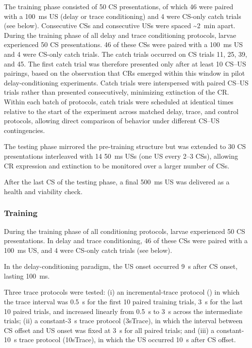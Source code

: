 The training phase consisted of 50 CS presentations, of which 46 were paired with a \SI{100}{\milli\second} US (delay or trace conditioning) and 4 were CS-only catch trials (see below). Consecutive CSs and consecutive USs were spaced \textasciitilde\SI{2}{\minute} apart.
During the training phase of all delay and trace conditioning protocols, larvae experienced 50 CS presentations. 46 of these CSs were paired with a \SI{100}{\milli\second} US and 4 were CS-only catch trials. The catch trials occurred on CS trials 11, 25, 39, and 45. The first catch trial was therefore presented only after at least 10 CS--US pairings, based on the observation that CRs emerged within this window in pilot delay-conditioning experiments. Catch trials were interspersed with paired CS--US trials rather than presented consecutively, minimizing extinction of the CR. Within each batch of protocols, catch trials were scheduled at identical times relative to the start of the experiment across matched delay, trace, and control protocols, allowing direct comparison of behavior under different CS--US contingencies.

The testing phase mirrored the pre-training structure but was extended to 30 CS presentations interleaved with 14 \SI{50}{\milli\second} USs (one US every 2--3 CSs), allowing CR expression and extinction to be monitored over a larger number of CSs.

After the last CS of the testing phase, a final \SI{500}{\milli\second} US was delivered as a health and viability check.

\subsubsection{Training}
During the training phase of all conditioning protocols, larvae experienced 50 CS presentations. In delay and trace conditioning, 46 of these CSs were paired with a \SI{100}{\milli\second} US, and 4 were CS-only catch trials (see below).

In the delay-conditioning paradigm, the US onset occurred \SI{9}{\second} after CS onset, lasting \SI{100}{\milli\second}.

Three trace protocols were tested: (i) an incremental-trace protocol () in which the trace interval was \SI{0.5}{\second} for the first 10 paired training trials, \SI{3}{\second} for the last 10 paired trials, and increased linearly from \SI{0.5}{\second} to \SI{3}{\second} across the intermediate trials; (ii) a constant-\SI{3}{\second} trace protocol (3sTrace), in which the interval between CS offset and US onset was fixed at \SI{3}{\second} for all paired trials; and (iii) a constant-\SI{10}{\second} trace protocol (10sTrace), in which the US occurred \SI{10}{\second} after CS offset.

